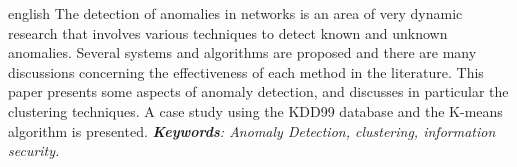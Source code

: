 \par
\begin{resumo}[Abstract]
\begin{otherlanguage*}{english}
	The detection of anomalies in networks is an area of very dynamic research that involves various techniques to detect known and unknown anomalies. Several systems and algorithms are proposed and there are many discussions concerning the effectiveness of each method in the literature. This paper presents some aspects of anomaly detection, and discusses in particular the clustering techniques. A case study using the KDD99 database and the K-means algorithm is presented.
\newline
\newline
\vspace{\onelineskip}
\noindent
\emph{
\noindent\textbf{Keywords}: Anomaly Detection, clustering, information security.}
\end{otherlanguage*}
\end{resumo}
